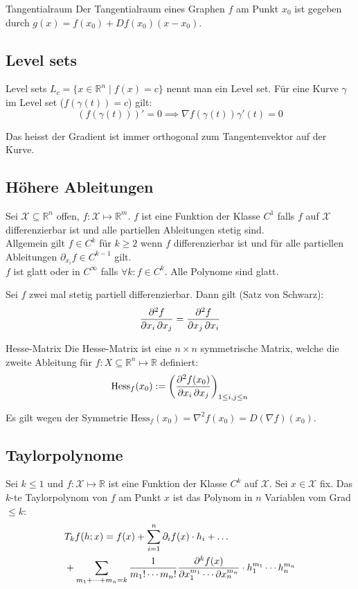 \documentclass[a4paper,10pt]{article}
\def\R{\mathbb{R}}
\def\X{\mathcal{X}}
\begin{document}
\begin{subbox}{Tangentialraum}
  Der Tangentialraum eines Graphen \(f\) am Punkt \(x_0\) ist gegeben durch \(g(x) = f(x_0) + Df(x_0)(x-x_0)\).
\end{subbox}

\subsection{Level sets}

\begin{mainbox}{Level sets}
  $L_c = \{ x \in \mathbb{R}^n \mid f(x) = c \}$ nennt man ein Level set.
  Für eine Kurve $\gamma$ im Level set ($f(\gamma(t)) = c$) gilt:
  $$(f(\gamma(t)))' = 0 \implies \nabla f(\gamma(t)) \gamma'(t) = 0$$
\end{mainbox}

Das heisst der Gradient ist immer orthogonal zum Tangentenvektor auf der Kurve.

\subsection{Höhere Ableitungen}
Sei \(\X \subseteq \R^n\) offen, \(f: \X \mapsto \R^m\). \(f\) ist eine Funktion der Klasse \(C^1\) falls \(f\) auf \(\X\) differenzierbar ist und alle partiellen Ableitungen stetig sind. \\
Allgemein gilt \(f \in C^k\) für \(k \ge 2\) wenn \(f\) differenzierbar ist und für alle partiellen Ableitungen \(\partial_{x_i} f \in C^{k-1}\) gilt. \\
\(f\) ist glatt oder in \(C^\infty\) falls \(\forall k: f \in C^k \). Alle Polynome sind glatt.

Sei $f$ zwei mal stetig partiell differenzierbar. Dann gilt (Satz von Schwarz):
$$\pdv{f}{x_i, x_j} = \pdv{f}{ x_j, x_i}$$

\begin{mainbox}{Hesse-Matrix}
  Die Hesse-Matrix ist eine \(n \times n\) symmetrische Matrix, welche die zweite Ableitung für $f: X \subseteq \mathbb{R}^n \mapsto \mathbb{R}$ definiert:
  \[\text{Hess}_f(x_0) := \left(\pdv{f(x_0)}{x_i, x_j}\right)_{1\le i,j \le n}\] 
\end{mainbox}

Es gilt wegen der Symmetrie $\text{Hess}_f(x_0) = \nabla^2 f(x_0) = D(\nabla f)(x_0)$.

\subsection{Taylorpolynome}
Sei \(k \le 1\) und \(f: \X \mapsto \R\) ist eine Funktion der Klasse \(C^k\) auf \(\X\). Sei \(x \in \X\) fix. Das \(k\)-te Taylorpolynom von \(f\) am Punkt \(x\) ist das Polynom in \(n\) Variablen vom Grad \(\le k\):
\begin{align*}
  &T_k f(h; x) = f(x) + \sum_{i=1}^n \partial_i f(x) \cdot h_i + \dots \\
  &+ \sum_{m_1 + \cdots + m_n = k} \frac{1}{m_1! \cdots m_n!} \pdv{^k f(x) }{x_1^{m_1} \cdots \partial x_n^{m_n}} \cdot h_1^{m_1} \cdots h_n^{m_n}
\end{align*}
\end{document}
